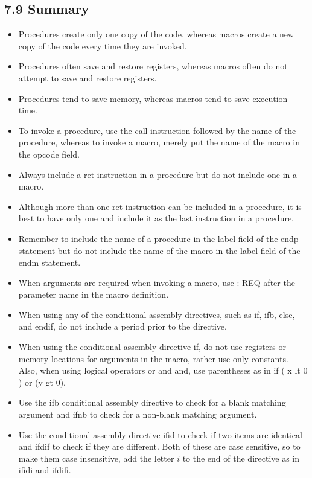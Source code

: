 \documentclass[10pt]{book}
\begin{document}
\subsection*{7.9 Summary}
\begin{itemize}
  \item Procedures create only one copy of the code, whereas macros create a new copy of the code every time they are invoked.
  \item Procedures often save and restore registers, whereas macros often do not attempt to save and restore registers.
  \item Procedures tend to save memory, whereas macros tend to save execution time.
  \item To invoke a procedure, use the call instruction followed by the name of the procedure, whereas to invoke a macro, merely put the name of the macro in the opcode field.
  \item Always include a ret instruction in a procedure but do not include one in a macro.
  \item Although more than one ret instruction can be included in a procedure, it is best to have only one and include it as the last instruction in a procedure.
  \item Remember to include the name of a procedure in the label field of the endp statement but do not include the name of the macro in the label field of the endm statement.
  \item When arguments are required when invoking a macro, use : REQ after the parameter name in the macro definition.
  \item When using any of the conditional assembly directives, such as if, ifb, else, and endif, do not include a period prior to the directive.
  \item When using the conditional assembly directive if, do not use registers or memory locations for arguments in the macro, rather use only constants. Also, when using logical operators or and and, use parentheses as in if ( x lt 0 ) or (y gt 0).
  \item Use the ifb conditional assembly directive to check for a blank matching argument and ifnb to check for a non-blank matching argument.
  \item Use the conditional assembly directive ifid to check if two items are identical and ifdif to check if they are different. Both of these are case sensitive, so to make them case insensitive, add the letter $i$ to the end of the directive as in ifidi and ifdifi.
\end{itemize}
\end{document}
